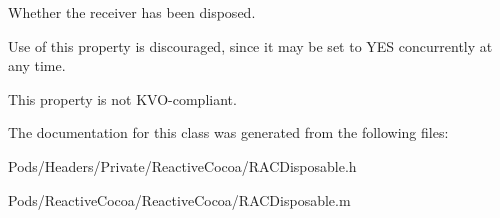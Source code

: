 Whether the receiver has been disposed.

Use of this property is discouraged, since it may be set to {\ttfamily Y\+ES} concurrently at any time.

This property is not K\+V\+O-\/compliant. 

The documentation for this class was generated from the following files\+:\begin{DoxyCompactItemize}
\item 
Pods/\+Headers/\+Private/\+Reactive\+Cocoa/R\+A\+C\+Disposable.\+h\item 
Pods/\+Reactive\+Cocoa/\+Reactive\+Cocoa/R\+A\+C\+Disposable.\+m\end{DoxyCompactItemize}
